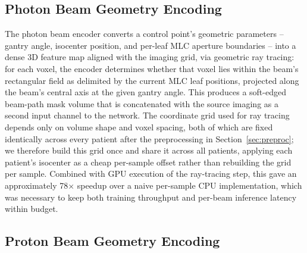 \documentclass[10pt,conference]{IEEEtran}
\begin{document}
\subsection{Photon Beam Geometry Encoding}
\label{sec:photon-encoder}

The photon beam encoder converts a control point's geometric parameters
-- gantry angle, isocenter position, and per-leaf MLC aperture
boundaries -- into a dense 3D feature map aligned with the imaging grid,
via geometric ray tracing: for each voxel, the encoder determines
whether that voxel lies within the beam's rectangular field as
delimited by the current MLC leaf positions, projected along the beam's
central axis at the given gantry angle. This produces a soft-edged
beam-path mask volume that is concatenated with the source imaging as a
second input channel to the network. The coordinate grid used for ray
tracing depends only on volume shape and voxel spacing, both of which
are fixed identically across every patient after the preprocessing in
Section~\ref{sec:preproc}; we therefore build this grid once and share
it across all patients, applying each patient's isocenter as a cheap
per-sample offset rather than rebuilding the grid per sample. Combined
with GPU execution of the ray-tracing step, this gave an approximately
78$\times$ speedup over a naive per-sample CPU implementation, which was
necessary to keep both training throughput and per-beam inference
latency within budget.

\subsection{Proton Beam Geometry Encoding}
\label{sec:proton-encoder}
\end{document}
